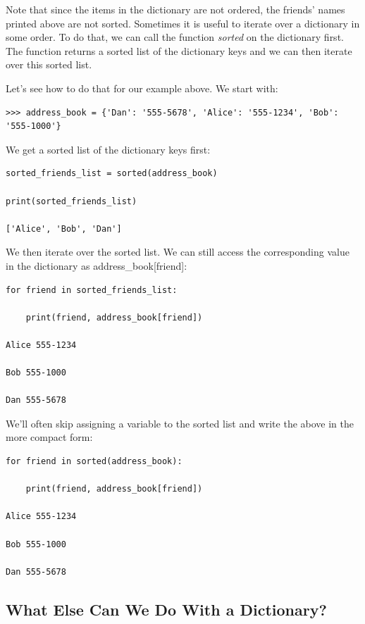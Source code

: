 \documentclass{article}
\begin{document}
Note that since the items in the dictionary are not ordered, the friends' names printed above are not sorted. Sometimes it is useful to iterate over a dictionary in some order.  To do that, we can call the function \textit{sorted} on the dictionary first.  The function returns a sorted list of the dictionary keys and we can then iterate over this sorted list.

Let's see how to do that for our example above.  We start with:

\begin{lstlisting}
>>> address_book = {'Dan': '555-5678', 'Alice': '555-1234', 'Bob': '555-1000'}
\end{lstlisting}

We get a sorted list of the dictionary keys first:

\begin{lstlisting}
sorted_friends_list = sorted(address_book)

print(sorted_friends_list)

['Alice', 'Bob', 'Dan']
\end{lstlisting}

We then iterate over the sorted list.  We can still access the corresponding value in the dictionary as address{\_}book[friend]: 

\begin{lstlisting}
for friend in sorted_friends_list:

    print(friend, address_book[friend])    

Alice 555-1234

Bob 555-1000

Dan 555-5678
\end{lstlisting}

We'll often skip assigning a variable to the sorted list and write the above in the more compact form:

\begin{lstlisting}
for friend in sorted(address_book):

    print(friend, address_book[friend])    

Alice 555-1234

​Bob 555-1000

Dan 555-5678
\end{lstlisting}

\subsection{What Else Can We Do With a Dictionary?}
\end{document}
